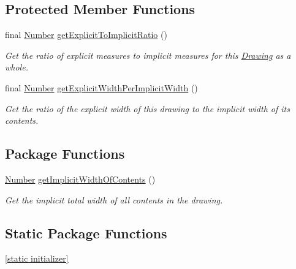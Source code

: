 \subsection*{Protected Member Functions}
\begin{DoxyCompactItemize}
\item 
final \hyperlink{interfacecom_1_1aarrelaakso_1_1drawl_1_1_number}{Number} \hyperlink{classcom_1_1aarrelaakso_1_1drawl_1_1_drawing_a9b47750a4d38fc2db164f0a0cb0e4a42}{get\+Explicit\+To\+Implicit\+Ratio} ()
\begin{DoxyCompactList}\small\item\em Get the ratio of explicit measures to implicit measures for this \hyperlink{classcom_1_1aarrelaakso_1_1drawl_1_1_drawing}{Drawing} as a whole. \end{DoxyCompactList}\item 
final \hyperlink{interfacecom_1_1aarrelaakso_1_1drawl_1_1_number}{Number} \hyperlink{classcom_1_1aarrelaakso_1_1drawl_1_1_drawing_afd070929603e97a649a65a888b5f76da}{get\+Explicit\+Width\+Per\+Implicit\+Width} ()
\begin{DoxyCompactList}\small\item\em Get the ratio of the explicit width of this drawing to the implicit width of its contents. \end{DoxyCompactList}\end{DoxyCompactItemize}
\subsection*{Package Functions}
\begin{DoxyCompactItemize}
\item 
\hyperlink{interfacecom_1_1aarrelaakso_1_1drawl_1_1_number}{Number} \hyperlink{classcom_1_1aarrelaakso_1_1drawl_1_1_drawing_a6434cc250ea5526a5778408aef18d293}{get\+Implicit\+Width\+Of\+Contents} ()
\begin{DoxyCompactList}\small\item\em Get the implicit total width of all contents in the drawing. \end{DoxyCompactList}\end{DoxyCompactItemize}
\subsection*{Static Package Functions}
\begin{DoxyCompactItemize}
\item 
\hyperlink{classcom_1_1aarrelaakso_1_1drawl_1_1_drawing_a40ce84a6d8110f7fb23a8faad42fb05f}{\mbox{[}static initializer\mbox{]}}
\end{DoxyCompactItemize}

